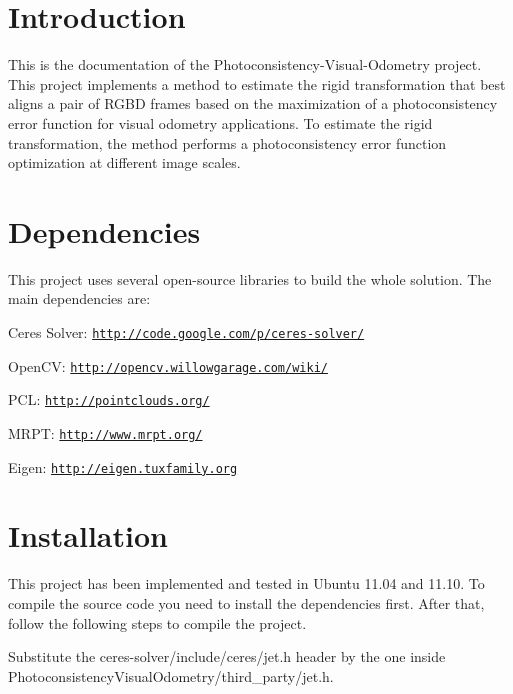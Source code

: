 \hypertarget{index_intro_sec}{}\section{Introduction}\label{index_intro_sec}
This is the documentation of the Photoconsistency-\/Visual-\/Odometry project. This project implements a method to estimate the rigid transformation that best aligns a pair of RGBD frames based on the maximization of a photoconsistency error function for visual odometry applications. To estimate the rigid transformation, the method performs a photoconsistency error function optimization at different image scales.

 \hypertarget{index_dependencies_sec}{}\section{Dependencies}\label{index_dependencies_sec}
This project uses several open-\/source libraries to build the whole solution. The main dependencies are:
\begin{DoxyItemize}
\item Ceres Solver: \href{http://code.google.com/p/ceres-solver/}{\tt http://code.google.com/p/ceres-\/solver/}
\item OpenCV: \href{http://opencv.willowgarage.com/wiki/}{\tt http://opencv.willowgarage.com/wiki/}
\item PCL: \href{http://pointclouds.org/}{\tt http://pointclouds.org/}
\item MRPT: \href{http://www.mrpt.org/}{\tt http://www.mrpt.org/}
\item Eigen: \href{http://eigen.tuxfamily.org}{\tt http://eigen.tuxfamily.org}
\end{DoxyItemize}\hypertarget{index_install_sec}{}\section{Installation}\label{index_install_sec}
This project has been implemented and tested in Ubuntu 11.04 and 11.10. To compile the source code you need to install the dependencies first. After that, follow the following steps to compile the project.
\begin{DoxyItemize}
\item Substitute the ceres-\/solver/include/ceres/jet.h header by the one inside PhotoconsistencyVisualOdometry/third\_\-party/jet.h.
\end{DoxyItemize}


